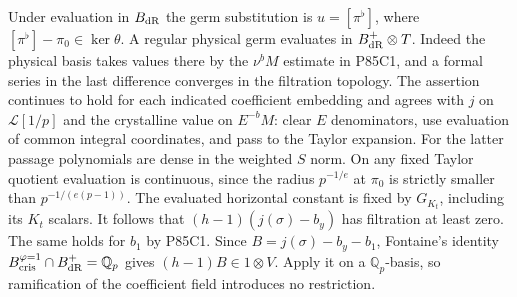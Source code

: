 Under evaluation in $B_{\rm dR}$ the germ substitution is
$u=[\pi^\flat]$, where $[\pi^\flat]-\pi_0\in\ker\theta$.
A regular physical germ evaluates in $B_{\rm dR}^+\otimes T$.
Indeed the physical basis takes values there by the
$\nu^bM$ estimate in P85C1, and a formal series in the last
difference converges in the filtration topology. The assertion
continues to hold for each indicated coefficient embedding and
agrees with $j$ on $\mathcal L[1/p]$ and the crystalline value on
$E^{-b}M$: clear $E$ denominators, use evaluation of common integral
coordinates, and pass to the Taylor expansion. For the latter
passage polynomials are dense in the weighted $S$ norm. On any
fixed Taylor quotient evaluation is continuous, since the radius
$p^{-1/e}$ at $\pi_0$ is strictly smaller than
$p^{-1/(e(p-1))}$. The evaluated horizontal constant is fixed
by $G_{K_t}$, including its $K_t$ scalars. It follows that
$(h-1)(j(\sigma)-b_y)$ has filtration at least zero. The same
holds for $b_1$ by P85C1. Since $B=j(\sigma)-b_y-b_1$,
Fontaine's identity $B_{\rm cris}^{\varphi=1}\cap
B_{\rm dR}^+=\mathbb Q_p$ gives $(h-1)B\in1\otimes V$.
Apply it on a $\mathbb Q_p$-basis, so ramification of the
coefficient field introduces no restriction.

